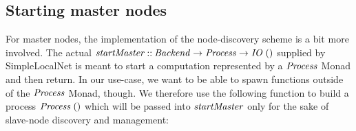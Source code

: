 \documentclass[paper=A4,twoside=true,openright,parskip=full,chapterprefix=true,headings=normal,bibliography=totoc,listof=totoc,titlepage=on,captions=tableabove,draft=false,british]{scrreprt}%
\begin{document}
\hypertarget{starting-master-nodes}{%
\subsection{Starting master nodes}\label{starting-master-nodes}}

\label{sec:cloudhaskellmasters}

For master nodes, the implementation of the node-discovery scheme is a
bit more involved. The actual
\ensuremath{\Varid{startMaster}\mathbin{::}\Conid{Backend}\to \Conid{Process}\to \Conid{IO}\;()} supplied by SimpleLocalNet
is meant to start a computation represented by a \ensuremath{\Conid{Process}} Monad and
then return. In our use-case, we want to be able to spawn functions
outside of the \ensuremath{\Conid{Process}} Monad, though. We therefore use the following
function to build a process \ensuremath{\Conid{Process}\;()} which will be passed into
\ensuremath{\Varid{startMaster}} only for the sake of slave-node discovery and management:
\end{document}
